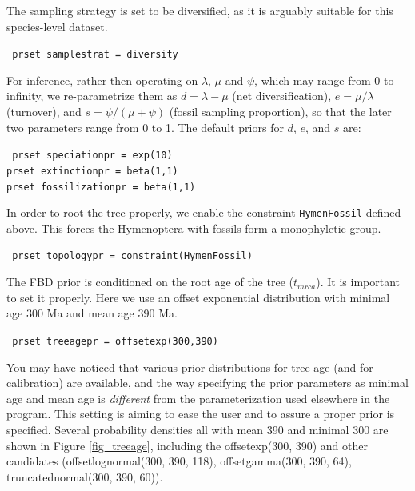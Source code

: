 \documentclass[12pt]{article}
\begin{document}
\noindent The sampling strategy is set to be diversified, as it is arguably suitable for this species-level dataset.

\medskip
{\tt \color{red} \noindent
prset samplestrat = diversity
}
\medskip

\noindent For inference, rather then operating on $\lambda$, $\mu$ and $\psi$, which may range from 0 to infinity, we re-parametrize them as $d = \lambda - \mu$ (net diversification), $e = \mu / \lambda$ (turnover), and $s = \psi/(\mu + \psi)$ (fossil sampling proportion), so that the later two parameters range from 0 to 1.
The default priors for $d$, $e$, and $s$ are:

\medskip
{\tt \color{red} \noindent
prset speciationpr = exp(10)      \\
prset extinctionpr = beta(1,1)    \\
prset fossilizationpr = beta(1,1)
}
\medskip

In order to root the tree properly, we enable the constraint {\tt HymenFossil} defined above.
This forces the Hymenoptera with fossils form a monophyletic group.

\medskip
{\tt \color{red} \noindent
prset topologypr = constraint(HymenFossil)
}
\medskip

The FBD prior is conditioned on the root age of the tree ($t_{mrca}$).
It is important to set it properly.
Here we use an offset exponential distribution with minimal age 300 Ma and mean age 390 Ma.

\medskip
{\tt \color{red} \noindent
prset treeagepr = offsetexp(300,390)
}
\medskip

You may have noticed that various prior distributions for tree age (and for calibration) are available, 
and the way specifying the prior parameters as minimal age and mean age is {\it different} from the parameterization used elsewhere in the program.
This setting is aiming to ease the user and to assure a proper prior is specified.
Several probability densities all with mean 390 and minimal 300 are shown in Figure \ref{fig_treeage}, including the offsetexp(300, 390) and other candidates (offsetlognormal(300, 390, 118), offsetgamma(300, 390, 64), truncatednormal(300, 390, 60)).
\end{document}
